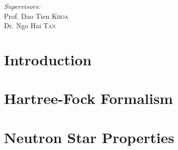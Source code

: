 \documentclass[a4paper,12pt]{report}
\theoremstyle{plain}\newtheorem{ques}{Question}
\theoremstyle{definition}\newtheorem*{ans}{Answer}
\begin{document}
\begin{titlepage}
                \begin{minipage}[t]{0.3\textwidth}
                        \begin{flushright}
                                \emph{Supervisors:}\\
                                Prof. Dao Tien \textsc{Khoa}\\
                                Dr. Ngo Hai \textsc{Tan}
                        \end{flushright}
                \end{minipage}
                \vfill
                {\large \thedate\par}
        \end{titlepage}  
        
        \restoregeometry
        \tableofcontents

        \printglossary[title={List of Abbreviations}]

        \captionsetup{width=0.9\linewidth}

        \chapter{Introduction}
        

        \chapter{Hartree-Fock Formalism}
        

        \chapter{Neutron Star Properties}
        

        \clearpage
        
        
\end{document}
